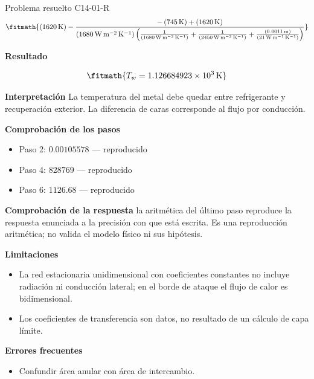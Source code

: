 \documentclass[10pt,openany]{book}
\begin{document}
\begin{studiumworked}{Problema resuelto C14-01-R}
\[
\fitmath{\left(1620\,\mathrm{K}\right) - \frac{- \left(745\,\mathrm{K}\right) + \left(1620\,\mathrm{K}\right)}{\left(1680\,\mathrm{W}\,\mathrm{m}^{-2}\,\mathrm{K}^{-1}\right) \left(\frac{1}{\left(1680\,\mathrm{W}\,\mathrm{m}^{-2}\,\mathrm{K}^{-1}\right)} + \frac{1}{\left(2450\,\mathrm{W}\,\mathrm{m}^{-2}\,\mathrm{K}^{-1}\right)} + \frac{\left(0.0011\,\mathrm{m}\right)}{\left(21\,\mathrm{W}\,\mathrm{m}^{-1}\,\mathrm{K}^{-1}\right)}\right)}}
\]

\noindent\textbf{Resultado}

\[
\fitmath{T_w=1.126684923\times10^{3}\,\mathrm{K}}
\]

\noindent\textbf{Interpretación}
La temperatura del metal debe quedar entre refrigerante y recuperación exterior. La diferencia de caras corresponde al flujo por conducción.

\noindent\textbf{Comprobación de los pasos}
\begin{itemize}
\item Paso 2: $0.00105578$ — reproducido
\item Paso 4: $828769$ — reproducido
\item Paso 6: $1126.68$ — reproducido
\end{itemize}

\noindent\textbf{Comprobación de la respuesta} la aritmética del último paso reproduce la respuesta enunciada a la precisión con que está escrita. Es una reproducción aritmética; no valida el modelo físico ni sus hipótesis.

\noindent\textbf{Limitaciones}
\begin{itemize}
\item La red estacionaria unidimensional con coeficientes constantes no incluye radiación ni conducción lateral; en el borde de ataque el flujo de calor es bidimensional.
\item Los coeficientes de transferencia son datos, no resultado de un cálculo de capa límite.
\end{itemize}

\noindent\textbf{Errores frecuentes}
\begin{itemize}
\item Confundir área anular con área de intercambio.
\end{itemize}
\end{studiumworked}
\end{document}
